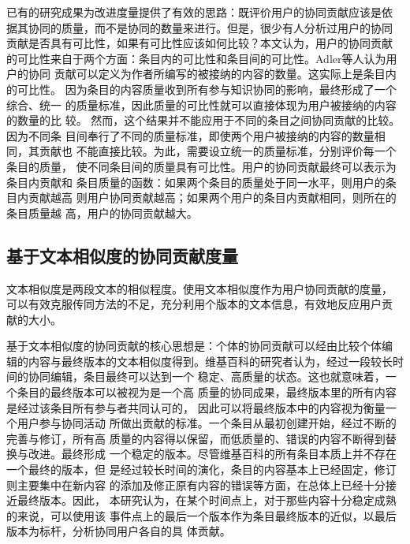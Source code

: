 已有的研究成果为改进度量提供了有效的思路：既评价用户的协同贡献应该是依
据其协同的质量，而不是协同的数量来进行。但是，很少有人分析过用户的协同
贡献是否具有可比性，如果有可比性应该如何比较？本文认为，用户的协同贡献
的可比性来自于两个方面：条目内的可比性和条目间的可比性。Adler等人认为用户的协同
贡献可以定义为作者所编写的被接纳的内容的数量。这实际上是条目内的可比性。
因为条目的内容质量收到所有参与知识协同的影响，最终形成了一个综合、统一
的质量标准，因此质量的可比性就可以直接体现为用户被接纳的内容的数量的比
较。
然而，这个结果并不能应用于不同的条目之间协同贡献的比较。因为不同条
目间奉行了不同的质量标准，即使两个用户被接纳的内容的数量相同，其贡献也
不能直接比较。为此，需要设立统一的质量标准，分别评价每一个条目的质量，
使不同条目间的质量具有可比性。用户的协同贡献最终可以表示为条目内贡献和
条目质量的函数：如果两个条目的质量处于同一水平，则用户的条目内贡献越高
则用户协同贡献越高；如果两个用户的条目内贡献相同，则所在的条目质量越
高，用户的协同贡献越大。



\subsection{基于文本相似度的协同贡献度量}

文本相似度是两段文本的相似程度。使用文本相似度作为用户协同贡献的度量，
可以有效克服传同方法的不足，充分利用个版本的文本信息，有效地反应用户贡
献的大小。

基于文本相似度的协同贡献的核心思想是：个体的协同贡献可以经由比较个体编
辑的内容与最终版本的文本相似度得到。维基百科的研究者认为，经过一段较长时间的协同编辑，条目最终可以达到一个
稳定、高质量的状态。这也就意味着，一个条目的最终版本可以被视为是一个高
质量的协同成果，最终版本里的所有内容是经过该条目所有参与者共同认可的，
因此可以将最终版本中的内容视为衡量一个用户参与协同活动
所做出贡献的标准。一个条目从最初创建开始，经过不断的完善与修订，所有高
质量的内容得以保留，而低质量的、错误的内容不断得到替换与改进。最终形成
一个稳定的版本。尽管维基百科的所有条目本质上并不存在一个最终的版本，但
是经过较长时间的演化，条目的内容基本上已经固定，修订则主要集中在新内容
的添加及修正原有内容的错误等方面，在总体上已经十分接近最终版本。因此，
本研究认为，在某个时间点上，对于那些内容十分稳定成熟的来说，可以使用该
事件点上的最后一个版本作为条目最终版本的近似，以最后版本为标杆，分析协同用户各自的具
体贡献。

